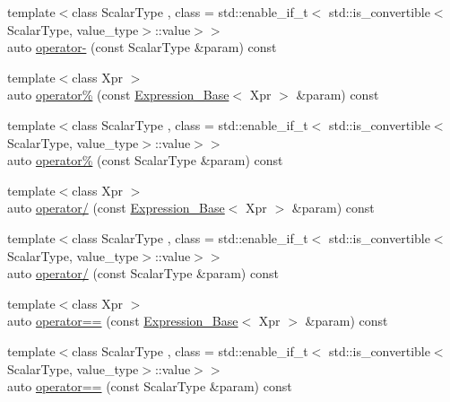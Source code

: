 \begin{DoxyCompactItemize}
\item 
{\footnotesize template$<$class Scalar\+Type , class  = std\+::enable\+\_\+if\+\_\+t$<$   std\+::is\+\_\+convertible$<$\+Scalar\+Type, value\+\_\+type$>$\+::value$>$$>$ }\\auto \hyperlink{classbc_1_1tensors_1_1Expression__Base_a602ef44919b1d284261041b65f6cda5f}{operator-\/} (const Scalar\+Type \&param) const
\item 
{\footnotesize template$<$class Xpr $>$ }\\auto \hyperlink{classbc_1_1tensors_1_1Expression__Base_ade41bf172c635b1320b304ec06e7eb97}{operator\%} (const \hyperlink{classbc_1_1tensors_1_1Expression__Base}{Expression\+\_\+\+Base}$<$ Xpr $>$ \&param) const
\item 
{\footnotesize template$<$class Scalar\+Type , class  = std\+::enable\+\_\+if\+\_\+t$<$   std\+::is\+\_\+convertible$<$\+Scalar\+Type, value\+\_\+type$>$\+::value$>$$>$ }\\auto \hyperlink{classbc_1_1tensors_1_1Expression__Base_a35bbc1902bc3234e6cb7a906302cae55}{operator\%} (const Scalar\+Type \&param) const
\item 
{\footnotesize template$<$class Xpr $>$ }\\auto \hyperlink{classbc_1_1tensors_1_1Expression__Base_aac23544543276824f91378096f4ca501}{operator/} (const \hyperlink{classbc_1_1tensors_1_1Expression__Base}{Expression\+\_\+\+Base}$<$ Xpr $>$ \&param) const
\item 
{\footnotesize template$<$class Scalar\+Type , class  = std\+::enable\+\_\+if\+\_\+t$<$   std\+::is\+\_\+convertible$<$\+Scalar\+Type, value\+\_\+type$>$\+::value$>$$>$ }\\auto \hyperlink{classbc_1_1tensors_1_1Expression__Base_ac948776e4b1e6b24da25dc61ee1614a4}{operator/} (const Scalar\+Type \&param) const
\item 
{\footnotesize template$<$class Xpr $>$ }\\auto \hyperlink{classbc_1_1tensors_1_1Expression__Base_a72826942e66345ca8dbf50e892b2743b}{operator==} (const \hyperlink{classbc_1_1tensors_1_1Expression__Base}{Expression\+\_\+\+Base}$<$ Xpr $>$ \&param) const
\item 
{\footnotesize template$<$class Scalar\+Type , class  = std\+::enable\+\_\+if\+\_\+t$<$   std\+::is\+\_\+convertible$<$\+Scalar\+Type, value\+\_\+type$>$\+::value$>$$>$ }\\auto \hyperlink{classbc_1_1tensors_1_1Expression__Base_ad532a22ae94a81d39e6f33f21745dacb}{operator==} (const Scalar\+Type \&param) const

\end{DoxyCompactItemize}
